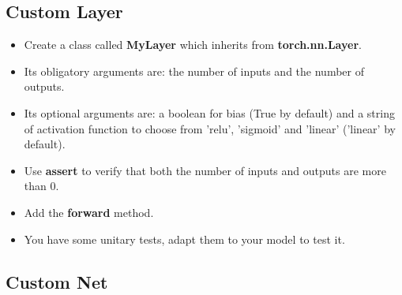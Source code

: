 \documentclass[11pt, a4paper]{article}
\begin{document}
\begin{multicols}{2}
	\subsection{Custom Layer}
	
	\begin{itemize}  
		\item Create a class called \textbf{MyLayer} which inherits from \textbf{torch.nn.Layer}.
		\item Its obligatory arguments are: the number of inputs and the number of outputs.
		\item Its optional arguments are: a boolean for bias (True by default) and a string of activation function to choose from 'relu', 'sigmoid' and 'linear' ('linear' by default).
		\item Use \textbf{assert} to verify that both the number of inputs and outputs are more than 0.
		\item Add the \textbf{forward} method.
		\item You have some unitary tests, adapt them to your model to test it.
	\end{itemize}
	
	\subsection{Custom Net}
	

\end{multicols}
\end{document}
